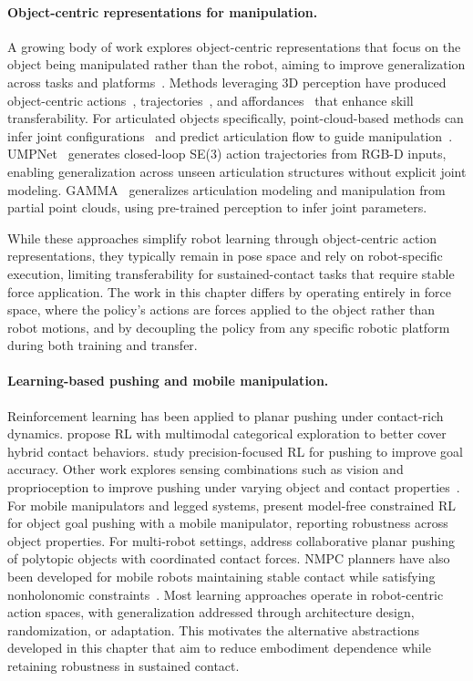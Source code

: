 \paragraph{Object-centric representations for manipulation.}
A growing body of work explores object-centric representations that focus on the object being manipulated rather than the robot, aiming to improve generalization across tasks and platforms~\citep{kroemer2021review}. Methods leveraging 3D perception have produced object-centric actions~\citep{mo2021where2act}, trajectories~\citep{wu2021vatmart}, and affordances~\citep{geng2023rlafford} that enhance skill transferability. For articulated objects specifically, point-cloud-based methods can infer joint configurations~\citep{yu2024gamma} and predict articulation flow to guide manipulation~\citep{eisner2022flowbot3d}. UMPNet~\citep{xu2022umpnet} generates closed-loop SE(3) action trajectories from RGB-D inputs, enabling generalization across unseen articulation structures without explicit joint modeling. GAMMA~\citep{yu2024gamma} generalizes articulation modeling and manipulation from partial point clouds, using pre-trained perception to infer joint parameters.

While these approaches simplify robot learning through object-centric action representations, they typically remain in pose space and rely on robot-specific execution, limiting transferability for sustained-contact tasks that require stable force application. The work in this chapter differs by operating entirely in force space, where the policy's actions are forces applied to the object rather than robot motions, and by decoupling the policy from any specific robotic platform during both training and transfer.

\paragraph{Learning-based pushing and mobile manipulation.}
Reinforcement learning has been applied to planar pushing under contact-rich dynamics. \citet{ferrandis2023nonprehensile} propose RL with multimodal categorical exploration to better cover hybrid contact behaviors. \citet{bergmann2025precision} study precision-focused RL for pushing to improve goal accuracy. Other work explores sensing combinations such as vision and proprioception to improve pushing under varying object and contact properties~\citep{cong2022vision,wang2023learning}. For mobile manipulators and legged systems, \citet{dadiotis2025dynamic} present model-free constrained RL for object goal pushing with a mobile manipulator, reporting robustness across object properties. For multi-robot settings, \citet{tang2024collaborative} address collaborative planar pushing of polytopic objects with coordinated contact forces. NMPC planners have also been developed for mobile robots maintaining stable contact while satisfying nonholonomic constraints~\citep{tang2023unwieldy}. Most learning approaches operate in robot-centric action spaces, with generalization addressed through architecture design, randomization, or adaptation. This motivates the alternative abstractions developed in this chapter that aim to reduce embodiment dependence while retaining robustness in sustained contact.

